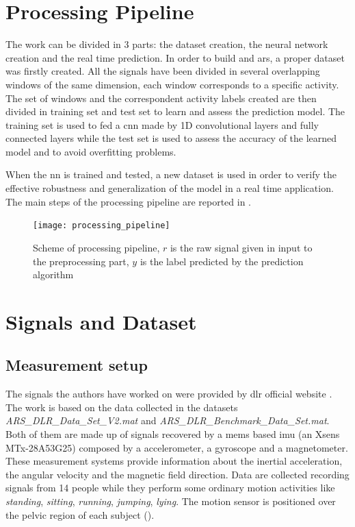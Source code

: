 
\section{Processing Pipeline}
\label{sec:processing_architecture}
The work can be divided in 3 parts: the dataset creation, the neural network creation and the real time prediction.
In order to build and \gls{ars}, a proper dataset was firstly created. All the signals have been divided in several overlapping windows of the same dimension, each window corresponds to a specific activity. The set of windows and the correspondent activity labels created are then divided in training set and test set to learn and assess the prediction model.
The training set is used to fed a \gls{cnn} made by 1D convolutional layers and fully connected layers while the test set is used to assess the accuracy of the learned model and to avoid overfitting problems.

When the \gls{nn} is trained and tested, a new dataset is used in order to verify the effective robustness and generalization of the model in a real time application.
The main steps of the processing pipeline are reported in .

\begin{figure}[htp]
\texttt{[image: processing\_pipeline]}
\caption{Scheme of processing pipeline, $r$ is the raw signal given in input to the preprocessing part, $y$ is the label predicted by the prediction algorithm}
\label{fig:processing_pipeline}
\end{figure}


\section{Signals and Dataset}
\label{sec:model}

\subsection{Measurement setup}
The signals the authors have worked on were provided by \gls{dlr} official website \cite{DLR}. The work is based on the data collected in the datasets  \textit{ARS\_DLR\_Data\_Set\_V2.mat} and \textit{ARS\_DLR\_Benchmark\_Data\_Set.mat}.
Both of them are made up of signals recovered by a \gls{mems} based \gls{imu} (an Xsens MTx-28A53G25) composed by a accelerometer, a gyroscope and a magnetometer. These measurement systems provide information about the inertial acceleration, the angular velocity and the magnetic field direction.
Data are collected recording signals from 14 people while they perform some ordinary motion activities like \textit{standing}, \textit{sitting}, \textit{running}, \textit{jumping}, \textit{lying}. The motion sensor is positioned over the pelvic region of each subject ().

